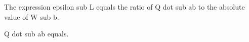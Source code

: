 The expression epsilon sub L equals the ratio of Q dot sub ab to the absolute value of W sub b.

Q dot sub ab equals.